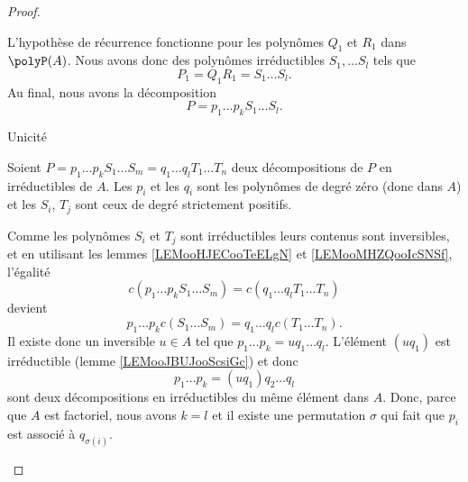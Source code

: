 \begin{proof}
\begin{subproof}
		L'hypothèse de récurrence fonctionne pour les polynômes \( Q_1\) et \( R_1\) dans \( \polyP(A)\). Nous avons donc des polynômes irréductibles \( S_1, \ldots S_l\) tels que
		\begin{equation}
			P_1=Q_1R_1=S_1\ldots S_l.
		\end{equation}
		Au final, nous avons la décomposition
		\begin{equation}
			P=p_1\ldots p_kS_1\ldots S_l.
		\end{equation}
	\end{subproof}

	\begin{proofpart}
		Unicité
	\end{proofpart}

	Soient \( P=p_1\ldots p_k S_1\ldots S_m=q_1\ldots q_lT_1\ldots T_n\) deux décompositions de \( P\) en irréductibles de \( A\). Les \( p_i\) et les \( q_i\) sont les polynômes de degré zéro (donc dans \( A\)) et les \( S_i\), \( T_j\) sont ceux de degré strictement positifs.

	\begin{subproof}

		Comme les polynômes \( S_i\) et \( T_j\) sont irréductibles leurs contenus sont inversibles, et en utilisant les lemmes \ref{LEMooHJECooTeELgN} et \ref{LEMooMHZQooIcSNSf}, l'égalité
		\begin{equation}
			c(p_1\ldots p_kS_1\ldots S_m)=c(q_1\ldots q_lT_1\ldots T_n)
		\end{equation}
		devient
		\begin{equation}
			p_1\ldots p_kc(S_1\ldots S_m)=q_1\ldots q_lc(T_1\ldots T_n).
		\end{equation}
		Il existe donc un inversible \( u\in A\) tel que \( p_1\ldots p_k=uq_1\ldots q_l\). L'élément \( (uq_1)\) est irréductible (lemme \ref{LEMooJBUJooScsiGc}) et donc
		\begin{equation}
			p_1\ldots p_k=(uq_1)q_2\ldots q_l
		\end{equation}
		sont deux décompositions en irréductibles du même élément dans \( A\). Donc, parce que \( A\) est factoriel, nous avons \( k=l\) et il existe une permutation \( \sigma\) qui fait que \( p_i\) est associé à \( q_{\sigma(i)}\).


\end{subproof}
\end{proof}
